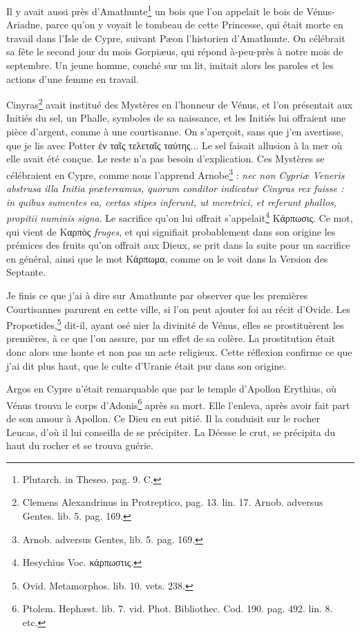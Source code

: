 \documentclass[a4paper, 18pt, oneside]{article}
\begin{document}
Il y avait aussi près d'Amathunte\footnote{Plutarch. in Theseo. pag. 9. C.} un bois que l'on appelait le bois de Vénus-Ariadne, parce qu'on y voyait le tombeau de cette Princesse, qui était morte en travail dans l'Isle de Cypre, suivant Pæon l'historien d'Amathunte. On célébrait sa fête le second jour du mois Gorpiæus, qui répond à-peu-près à notre mois de septembre. Un jeune homme, couché sur un lit, imitait alors les paroles et les actions d'une femme en travail.

Cinyras\footnote{Clemens Alexandrinus in Protreptico, pag. 13. lin. 17. Arnob. adversus Gentes. lib. 5. pag. 169.} avait institué des Mystères en l'honneur de Vénus, et l'on présentait aux Initiés du sel, un Phalle, symboles de sa naissance, et les Initiés lui offraient une pièce d'argent, comme à une courtisanne. On s'aperçoit, sans que j'en avertisse, que je lis avec Potter ἐν ταῖς τελεταῖς ταύτης... Le sel faisait allusion à la mer où elle avait été conçue. Le reste n'a pas besoin d'explication. Ces Mystères se célébraient en Cypre, comme nous l'apprend Arnobe\footnote{Arnob. adversus Gentes, lib. 5. pag. 169.} : \emph{nec non Cypriæ Veneris abstrusa illa Initia prætereamus, quorum conditor indicatur Cinyras rex fuisse : in quibus sumentes ea, certas stipes inferunt, ut meretrici, et referunt phallos, propitii numinis signa}. Le sacrifice qu'on lui offrait s'appelait\footnote{Hesychius Voc. κάρπωστις.} Κάρπωσις. Ce mot, qui vient de Καρπὸς \emph{fruges}, et qui signifiait probablement dans son origine les prémices des fruits qu'on offrait aux Dieux, se prit dans la suite pour un sacrifice en général, ainsi que le mot Κάρπωμα, comme on le voit dans la Version des Septante.

Je finis ce que j'ai à dire sur Amathunte par observer que les premières Courtisannes parurent en cette ville, si l'on peut ajouter foi au récit d'Ovide. Les Propœtides,\footnote{Ovid. Metamorphos. lib. 10. vets. 238.} dit-il, ayant osé nier la divinité de Vénus, elles se prostituèrent les premières, à ce que l'on assure, par un effet de sa colère. La prostitution était donc alors une honte et non pas un acte religieux. Cette réflexion confirme ce que j'ai dit plus haut, que le culte d'Uranie était pur dans son origine.

Argos en Cypre n'était remarquable que par le temple d'Apollon Erythius, où Vénus trouva le corps d'Adonis\footnote{Ptolem. Hephæst. lib. 7. vid. Phot. Bibliothec. Cod. 190. pag. 492. lin. 8. etc.} après sa mort. Elle l'enleva, après avoir fait part de son amour à Apollon. Ce Dieu en eut pitié. Il la conduisit sur le rocher Leucas, d'où il lui conseilla de se précipiter. La Déesse le crut, se précipita du haut du rocher et se trouva guérie.
\end{document}
